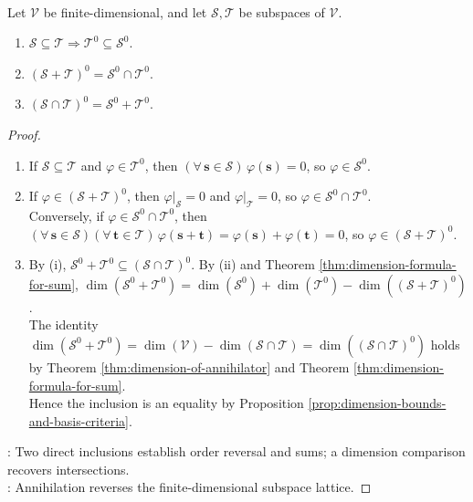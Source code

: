 \begin{theorem} \label{thm:annihilator-lattice-identities} \\
Let $\mathcal{V}$ be finite-dimensional, and let $\mathcal{S},\mathcal{T}$ be subspaces of $\mathcal{V}$.
\begin{enumerate}[label=(\roman*)]
\setlength{\itemsep}{0pt}
\item $\mathcal{S}\subseteq\mathcal{T}\Rightarrow\mathcal{T}^0\subseteq\mathcal{S}^0$.
\item $(\mathcal{S}+\mathcal{T})^0=\mathcal{S}^0\cap\mathcal{T}^0$.
\item $(\mathcal{S}\cap\mathcal{T})^0=\mathcal{S}^0+\mathcal{T}^0$.
\end{enumerate}
\begin{proof}
\begin{enumerate}[label=(\roman*)]
\setlength{\itemsep}{0pt}
\item If $\mathcal{S}\subseteq\mathcal{T}$ and $\varphi\in\mathcal{T}^0$, then $(\forall\,\mathbf{s}\in\mathcal{S})\,\varphi(\mathbf{s})=0$, so $\varphi\in\mathcal{S}^0$.
\item If $\varphi\in(\mathcal{S}+\mathcal{T})^0$, then $\varphi|_{\mathcal{S}}=0$ and $\varphi|_{\mathcal{T}}=0$, so $\varphi\in\mathcal{S}^0\cap\mathcal{T}^0$.\\
Conversely, if $\varphi\in\mathcal{S}^0\cap\mathcal{T}^0$, then $(\forall\,\mathbf{s}\in\mathcal{S})(\forall\,\mathbf{t}\in\mathcal{T})\,\varphi(\mathbf{s}+\mathbf{t})=\varphi(\mathbf{s})+\varphi(\mathbf{t})=0$, so $\varphi\in(\mathcal{S}+\mathcal{T})^0$.
\item By (i), $\mathcal{S}^0+\mathcal{T}^0\subseteq(\mathcal{S}\cap\mathcal{T})^0$. By (ii) and Theorem \ref{thm:dimension-formula-for-sum}, $\dim(\mathcal{S}^0+\mathcal{T}^0)=\dim(\mathcal{S}^0)+\dim(\mathcal{T}^0)-\dim((\mathcal{S}+\mathcal{T})^0)$.\\
The identity $\dim(\mathcal{S}^0+\mathcal{T}^0)=\dim(\mathcal{V})-\dim(\mathcal{S}\cap\mathcal{T})=\dim((\mathcal{S}\cap\mathcal{T})^0)$ holds by Theorem \ref{thm:dimension-of-annihilator} and Theorem \ref{thm:dimension-formula-for-sum}.\\
Hence the inclusion is an equality by Proposition \ref{prop:dimension-bounds-and-basis-criteria}.
\end{enumerate}
: Two direct inclusions establish order reversal and sums; a dimension comparison recovers intersections.\\
: Annihilation reverses the finite-dimensional subspace lattice.
\end{proof}
\end{theorem}

